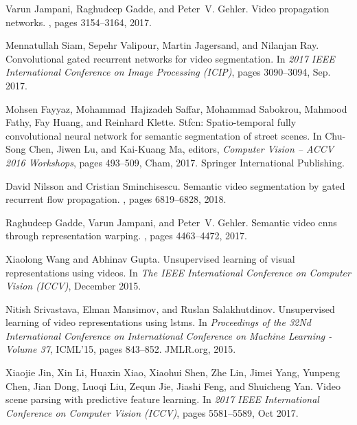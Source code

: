 \documentclass{article}
\begin{document}
\newpage
{\small

\begin{thebibliography}{10}

Varun Jampani, Raghudeep Gadde, and Peter~V. Gehler.
\newblock Video propagation networks.
, pages 3154--3164, 2017.

Mennatullah Siam, Sepehr Valipour, Martin Jagersand, and Nilanjan Ray.
\newblock Convolutional gated recurrent networks for video segmentation.
\newblock In {\em 2017 IEEE International Conference on Image Processing
  (ICIP)}, pages 3090--3094, Sep. 2017.

Mohsen Fayyaz, Mohammad~Hajizadeh Saffar, Mohammad Sabokrou, Mahmood Fathy, Fay
  Huang, and Reinhard Klette.
\newblock Stfcn: Spatio-temporal fully convolutional neural network for
  semantic segmentation of street scenes.
\newblock In Chu-Song Chen, Jiwen Lu, and Kai-Kuang Ma, editors, {\em Computer
  Vision -- ACCV 2016 Workshops}, pages 493--509, Cham, 2017. Springer
  International Publishing.

David Nilsson and Cristian Sminchisescu.
\newblock Semantic video segmentation by gated recurrent flow propagation.
, pages 6819--6828, 2018.

Raghudeep Gadde, Varun Jampani, and Peter~V. Gehler.
\newblock Semantic video cnns through representation warping.
,
  pages 4463--4472, 2017.

Xiaolong Wang and Abhinav Gupta.
\newblock Unsupervised learning of visual representations using videos.
\newblock In {\em The IEEE International Conference on Computer Vision (ICCV)},
  December 2015.

Nitish Srivastava, Elman Mansimov, and Ruslan Salakhutdinov.
\newblock Unsupervised learning of video representations using lstms.
\newblock In {\em Proceedings of the 32Nd International Conference on
  International Conference on Machine Learning - Volume 37}, ICML'15, pages
  843--852. JMLR.org, 2015.

Xiaojie Jin, Xin Li, Huaxin Xiao, Xiaohui Shen, Zhe Lin, Jimei Yang, Yunpeng
  Chen, Jian Dong, Luoqi Liu, Zequn Jie, Jiashi Feng, and Shuicheng Yan.
\newblock Video scene parsing with predictive feature learning.
\newblock In {\em 2017 IEEE International Conference on Computer Vision
  (ICCV)}, pages 5581--5589, Oct 2017.


\end{thebibliography}}
\end{document}
